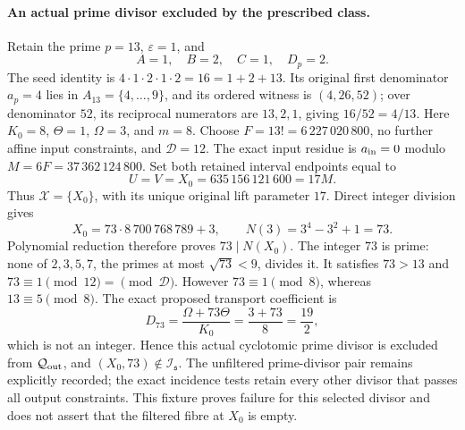 \paragraph{An actual prime divisor excluded by the prescribed class.}
Retain the prime \(p=13\), \(\varepsilon=1\), and
\[
 A=1,\quad B=2,\quad C=1,\quad D_p=2.
\]
The seed identity is \(4\cdot1\cdot2\cdot1\cdot2=16=1+2+13\).
Its original first denominator \(a_p=4\) lies in
\(A_{13}=\{4,\ldots,9\}\), and its ordered witness is
\((4,26,52)\); over denominator \(52\), its reciprocal
numerators are \(13,2,1\), giving \(16/52=4/13\).
Here \(K_0=8\), \(\Theta=1\), \(\Omega=3\), and \(m=8\).
Choose \(F=13!=6\,227\,020\,800\), no further affine input
constraints, and \(\mathcal D=12\).  The exact input residue is
\(a_{\rm in}=0\) modulo \(M=6F=37\,362\,124\,800\).
Set both retained interval endpoints equal to
\[
 U=V=X_0=635\,156\,121\,600=17M.
\]
Thus \(\mathcal X=\{X_0\}\), with its unique original lift
parameter \(17\).  Direct integer division gives
\[
 X_0=73\cdot8\,700\,768\,789+3,
 \qquad N(3)=3^4-3^2+1=73.
\]
Polynomial reduction therefore proves \(73\mid N(X_0)\).
The integer \(73\) is prime: none of \(2,3,5,7\), the primes
at most \(\sqrt{73}<9\), divides it.  It satisfies \(73>13\)
and \(73\equiv1\pmod{12}=\pmod{\mathcal D}\).
However \(73\equiv1\pmod8\), whereas \(13\equiv5\pmod8\).
The exact proposed transport coefficient is
\[
 D_{73}=\frac{\Omega+73\Theta}{K_0}
       =\frac{3+73}{8}=\frac{19}{2},
\]
which is not an integer.  Hence this actual cyclotomic prime
divisor is excluded from \(\mathcal Q_{\rm out}\), and
\((X_0,73)\notin\mathcal I_{\mathfrak s}\).
The unfiltered prime-divisor pair remains explicitly recorded;
the exact incidence tests retain every other divisor that passes
all output constraints.  This fixture proves failure for this
selected divisor and does not assert that the filtered fibre
at \(X_0\) is empty.
